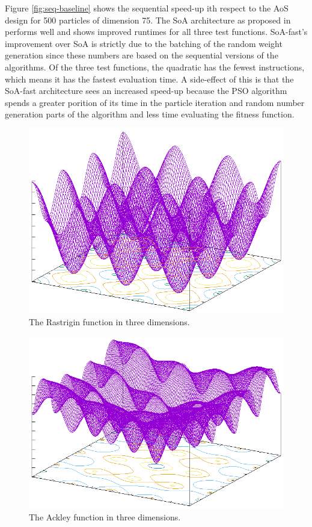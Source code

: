 Figure \ref{fig:seq-baseline} shows the sequential speed-up ith respect to the
AoS design for 500 particles of dimension 75. The SoA architecture as proposed
in \cite{cache-pso} performs well and shows improved runtimes for all three test
functions. SoA-fast's improvement over SoA is strictly due to the
batching of the random weight generation since these numbers are based on the
sequential versions of the algorithms. Of the three test functions, the
quadratic has the fewest instructions, which means it has the fastest evaluation
time. A side-effect of this is that the SoA-fast architecture sees an
increased speed-up because the PSO algorithm spends a greater porition of its
time in the particle iteration and random number generation parts of the
algorithm and less time evaluating the fitness function.



\begin{figure}
  \includegraphics[width=\columnwidth]{../img/output/rastrigin}
  \caption{The Rastrigin function in three dimensions.}\label{fig:rastrigin}
\end{figure}

\begin{figure}
  \includegraphics[width=\columnwidth]{../img/output/ackley}
  \caption{The Ackley function in three dimensions.}\label{fig:ackley}
\end{figure}

